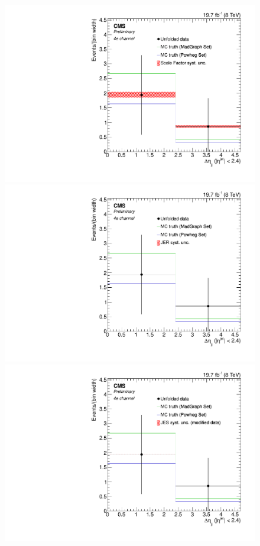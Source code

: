 \begin{figure}[hbtp]
\begin{center}
   \includegraphics[width=0.8\cmsFigWidth]{Figures/Unfolding/Systematics/ZZTo4e_CentralDeta_SFSq_Mad_fr}
   \includegraphics[width=0.8\cmsFigWidth]{Figures/Unfolding/Systematics/ZZTo4e_CentralDeta_JER_Mad_fr}
   \includegraphics[width=0.8\cmsFigWidth]{Figures/Unfolding/Systematics/ZZTo4e_CentralDeta_JES_ModData_Mad_fr}     

\end{center}
\end{figure}
